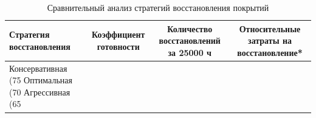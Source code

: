 \begin{table}
\caption{Сравнительный анализ стратегий восстановления покрытий}
\label{tab:restoration_strategies}
\begin{tabular}{|l|c|c|c|}
\toprule
Стратегия восстановления & Коэффициент готовности & Количество восстановлений за 25000 ч & Относительные затраты на восстановление* \\
\midrule
Консервативная 
(75%
Оптимальная 
(70%
Агрессивная 
(65%
\bottomrule
\end{tabular}
\end{table}


